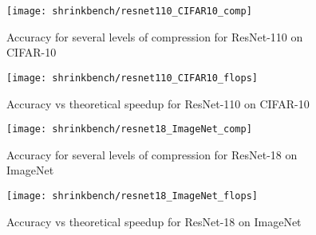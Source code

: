


\begin{figure*}
\begin{minipage}[b]{.45\textwidth}
\centering
\texttt{[image: shrinkbench/resnet110\_CIFAR10\_comp]}
\caption{Accuracy for several levels of compression for ResNet-110 on CIFAR-10}
\end{minipage}
\hfill
\begin{minipage}[b]{.45\textwidth}
\centering
\texttt{[image: shrinkbench/resnet110\_CIFAR10\_flops]}
\caption{Accuracy vs theoretical speedup for ResNet-110 on CIFAR-10}
\end{minipage}
\end{figure*}



\begin{figure*}
\begin{minipage}[b]{.45\textwidth}
\centering
\texttt{[image: shrinkbench/resnet18\_ImageNet\_comp]}
\caption{Accuracy for several levels of compression for ResNet-18 on ImageNet}
\end{minipage}
\hfill
\begin{minipage}[b]{.45\textwidth}
\centering
\texttt{[image: shrinkbench/resnet18\_ImageNet\_flops]}
\caption{Accuracy vs theoretical speedup for ResNet-18 on ImageNet}
\end{minipage}
\end{figure*}

